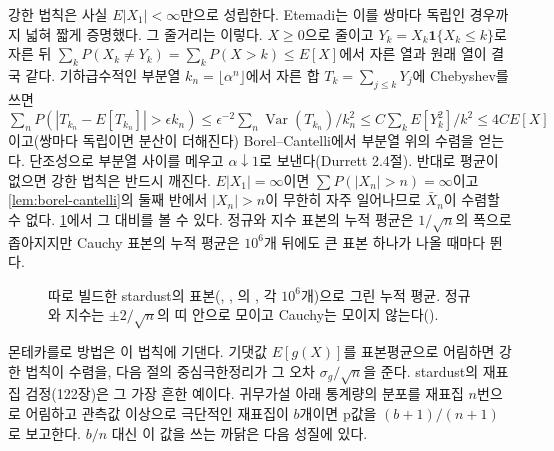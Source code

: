 강한 법칙은 사실 $E|X_1|<\infty$만으로 성립한다. Etemadi는 이를 쌍마다 독립인 경우까지 넓혀 짧게 증명했다\cite{etemadi1981}. 그 줄거리는 이렇다. $X\ge0$으로 줄이고 $Y_k=X_k\mathbf 1\{X_k\le k\}$로 자른 뒤 $\sum_kP(X_k\ne Y_k)=\sum_kP(X>k)\le E[X]$에서 자른 열과 원래 열이 결국 같다. 기하급수적인 부분열 $k_n=\lfloor\alpha^n\rfloor$에서 자른 합 $T_k=\sum_{j\le k}Y_j$에 Chebyshev를 쓰면 $\sum_nP(|T_{k_n}-E[T_{k_n}]|>\epsilon k_n)\le\epsilon^{-2}\sum_n\operatorname{Var}(T_{k_n})/k_n^2\le C\sum_kE[Y_k^2]/k^2\le4CE[X]$이고(쌍마다 독립이면 분산이 더해진다) Borel--Cantelli에서 부분열 위의 수렴을 얻는다. 단조성으로 부분열 사이를 메우고 $\alpha\downarrow1$로 보낸다(Durrett\cite{durrett2019} 2.4절). 반대로 평균이 없으면 강한 법칙은 반드시 깨진다. $E|X_1|=\infty$이면 $\sum P(|X_n|>n)=\infty$이고 \cref{lem:borel-cantelli}의 둘째 반에서 $|X_n|>n$이 무한히 자주 일어나므로 $\bar X_n$이 수렴할 수 없다. \cref{fig:lln}에서 그 대비를 볼 수 있다. 정규와 지수 표본의 누적 평균은 $1/\sqrt n$의 폭으로 좁아지지만 Cauchy 표본의 누적 평균은 $10^6$개 뒤에도 큰 표본 하나가 나올 때마다 뛴다.

\begin{figure}[htbp]
\centering
{}
\caption{따로 빌드한 stardust의 표본(, , 의 , 각 $10^6$개)으로 그린 누적 평균. 정규와 지수는 $\pm2/\sqrt n$의 띠 안으로 모이고 Cauchy는 모이지 않는다().}
\label{fig:lln}
\end{figure}

몬테카를로 방법은 이 법칙에 기댄다. 기댓값 $E[g(X)]$를 표본평균으로 어림하면 강한 법칙이 수렴을, 다음 절의 중심극한정리가 그 오차 $\sigma_g/\sqrt n$을 준다. stardust의 재표집 검정(122장)은 그 가장 흔한 예이다. 귀무가설 아래 통계량의 분포를 재표집 $n$번으로 어림하고 관측값 이상으로 극단적인 재표집이 $b$개이면 p값을 $(b+1)/(n+1)$로 보고한다. $b/n$ 대신 이 값을 쓰는 까닭은 다음 성질에 있다.

